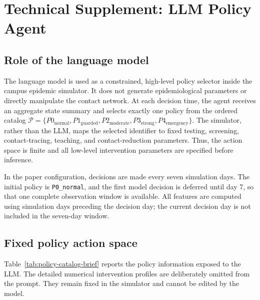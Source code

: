 
\section{Technical Supplement: LLM Policy Agent}
\label{app:llm-policy-agent}

\subsection{Role of the language model}

The language model is used as a constrained, high-level policy selector inside
the campus epidemic simulator.  It does not generate epidemiological parameters
or directly manipulate the contact network.  At each decision time, the agent
receives an aggregate state summary and selects exactly one policy from the
ordered catalog
\(
\mathcal{P}=\{P0_{\mathrm{normal}},P1_{\mathrm{guarded}},
P2_{\mathrm{moderate}},P3_{\mathrm{strong}},P4_{\mathrm{emergency}}\}
\).
The simulator, rather than the LLM, maps the selected identifier to fixed
testing, screening, contact-tracing, teaching, and contact-reduction parameters.
Thus, the action space is finite and all low-level intervention parameters are
specified before inference.

In the paper configuration, decisions are made every seven simulation days.
The initial policy is \texttt{P0\_normal}, and the first model decision is
deferred until day 7, so that one complete observation window is available.
All features are computed using simulation days preceding the decision day;
the current decision day is not included in the seven-day window.

\subsection{Fixed policy action space}

Table~\ref{tab:policy-catalog-brief} reports the policy information exposed to
the LLM.  The detailed numerical intervention profiles are deliberately omitted
from the prompt.  They remain fixed in the simulator and cannot be edited by the
model.

